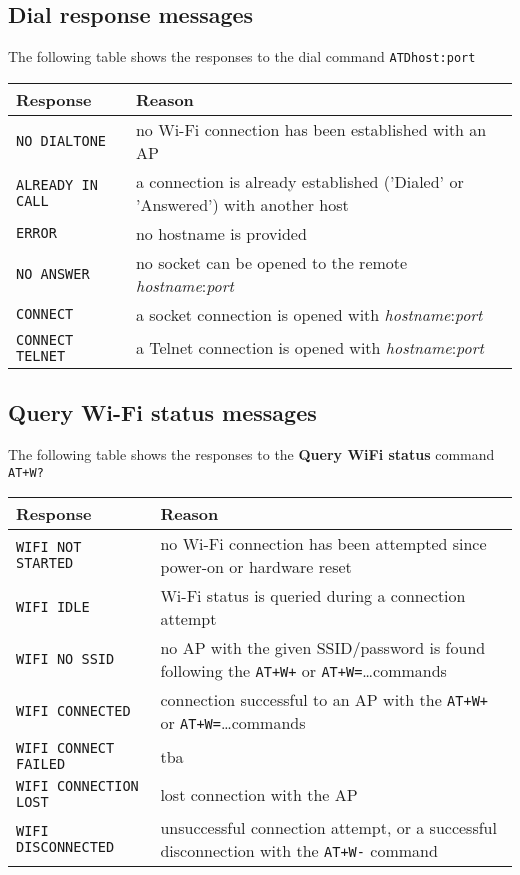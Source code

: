 \subsection{Dial response messages}

The following table shows the responses to the dial command \texttt{ATDhost:port}
\medskip

\begin{tabular}{p{8em} | p{}}
\hline
\textbf{Response} & \textbf{Reason} \\
\hline
\footnotesize{\texttt{NO DIALTONE}}			& no Wi-Fi connection has been established with an AP \\
\footnotesize{\texttt{ALREADY IN CALL}}		& a connection is already established ('Dialed' or 'Answered') with another host \\
\footnotesize{\texttt{ERROR}}				& no hostname is provided \\
\footnotesize{\texttt{NO ANSWER}}			& no socket can be opened to the remote \textit{hostname}:\textit{port} \\
\footnotesize{\texttt{CONNECT}}				& a socket connection is opened with \textit{hostname}:\textit{port} \\
\footnotesize{\texttt{CONNECT TELNET}}		& a Telnet connection is opened with \textit{hostname}:\textit{port} \\
\hline
\end{tabular}

\subsection{Query Wi-Fi status messages}

The following table shows the responses to the \textbf{Query WiFi status} command \texttt{AT+W?}
\medskip

\begin{tabular}{p{10.5em} | p{}}
\hline
\textbf{Response} & \textbf{Reason} \\
\hline
\footnotesize{\texttt{WIFI NOT STARTED}}	& no Wi-Fi connection has been attempted since power-on or hardware reset \\
\footnotesize{\texttt{WIFI IDLE}}			& Wi-Fi status is queried during a connection attempt \\
\footnotesize{\texttt{WIFI NO SSID}}		& no AP with the given SSID/password is found following the \texttt{AT+W+} or \texttt{AT+W=}\dots commands \\
\footnotesize{\texttt{WIFI CONNECTED}}		& connection successful to an AP with the \texttt{AT+W+} or \texttt{AT+W=}\dots commands \\
\footnotesize{\texttt{WIFI CONNECT FAILED}}	& tba \\
\footnotesize{\texttt{WIFI CONNECTION LOST}}	& lost connection with the AP \\
\footnotesize{\texttt{WIFI DISCONNECTED}}		& unsuccessful connection attempt, or a successful disconnection with the \texttt{AT+W-} command \\
\hline
\end{tabular}

